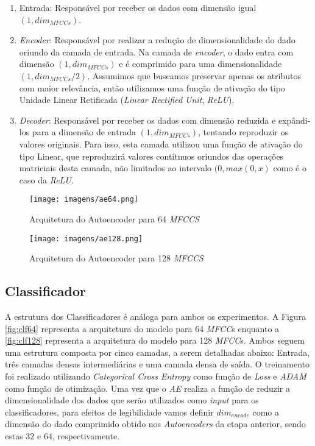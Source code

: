 \begin{enumerate}
    \item Entrada: Responsável por receber os dados com dimensão igual $(1, dim_{MFCCs})$.
    \item \textit{Encoder}: Responsável por realizar a redução de dimensionalidade do dado oriundo da camada de entrada. Na camada de \textit{encoder}, o dado entra com dimensão $(1, dim_{MFCCs})$ e é comprimido para uma dimensionalidade $(1, dim_{MFCCs}/2)$. Assumimos que buscamos preservar apenas os atributos com maior relevância, então utilizamos uma função de ativação do tipo Unidade Linear Retificada (\textit{Linear Rectified Unit}, \textit{ReLU}).
    \item \textit{Decoder}: Responsável por receber os dados com dimensão reduzida e expândi-los para a dimensão de entrada $(1, dim_{MFCCs})$, tentando reproduzir os valores originais. Para isso, esta camada utilizou uma função de ativação do tipo Linear, que reproduzirá valores contítnuos oriundos das operações matriciais desta camada, não limitados ao intervalo $(0, max(0, x)$ como é o caso da \textit{ReLU}.
\end{enumerate}

\begin{figure}[h]
    \centering
    \begin{minipage}[b]{0.4\linewidth}
        \centering
        \texttt{[image: imagens/ae64.png]}
        \caption{\label{fig:ae64}Arquitetura do Autoencoder para 64 \textit{MFCCS}}
    \end{minipage}
    \begin{minipage}[b]{0.4\linewidth}
        \centering
        \texttt{[image: imagens/ae128.png]}
        \caption{\label{fig:ae128}Arquitetura do Autoencoder para 128 \textit{MFCCS}}
    \end{minipage}
\end{figure}

\subsection{Classificador}

A estrutura dos Classificadores é análoga para ambos os experimentos. A Figura \ref{fig:clf64} representa a arquitetura do modelo para 64 \textit{MFCC}s enquanto a \ref{fig:clf128} representa a arquitetura do modelo para 128 \textit{MFCC}s. Ambos seguem uma estrutura composta por cinco camadas, a serem detalhadas abaixo: Entrada, três camadas densas intermediárias e uma camada densa de saída. O treinamento foi realizado utilizando \textit{Categorical Cross Entropy} como função de \textit{Loss} e \textit{ADAM} como função de otimização. Uma vez que o \textit{AE} realiza a função de reduzir a dimensionalidade dos dados que serão utilizados como \textit{input} para os classificadores, para efeitos de legibilidade vamos definir $dim_{encode}$ como a dimensão do dado comprimido obtido nos \textit{Autoencoders} da etapa anterior, sendo estas 32 e 64, respectivamente.

